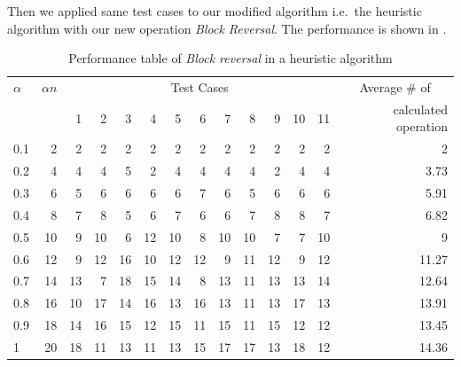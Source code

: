 				
Then we applied same test cases to our modified algorithm i.e.\ the
heuristic algorithm with our new operation \textit{Block Reversal}. The
performance is shown in .


\begin{table}[!tb]
  \begin{center}
    \caption{Performance table of \emph{Block reversal} in a heuristic algorithm}
    \label{tab_our}

    \begin{tabular}{|l|r|r|r|r|r|r|r|r|r|r|r|r|r|}
      \hline
      $\alpha$     & $\alpha n$ & \multicolumn{11}{c|}{Test Cases} & \multicolumn{1}{c|}{Average \# of}                                     \\
      \cline{3-13} &            & 1                                & 2  & 3  & 4  & 5  & 6  & 7  & 8  & 9  & 10 & 11 & calculated operation \\
      \hline
      0.1        & 2          & 2                                & 2	& 2  & 2  & 2  & 2  & 2  & 2  &	2  & 2	& 2  & 2                    \\
      0.2        & 4          & 4                                & 4	& 5  & 2  & 4  & 4  & 4  & 4  &	2  & 4	& 4  & 3.73                 \\
      0.3        & 6          & 5                                & 6	& 6  & 6  & 6  & 7  & 6  & 5  &	6  & 6	& 6  & 5.91                 \\
      0.4        & 8          & 7                                & 8	& 5  & 6  & 7  & 6  & 6  & 7  &	8  & 8	& 7  & 6.82                 \\
      0.5        & 10         & 9                                & 10	& 6  & 12 & 10 & 8  & 10 & 10 &	7  & 7	& 10 & 9                    \\
      0.6        & 12         & 9                                & 12	& 16 & 10 & 12 & 12 & 9  & 11 &	12 & 9	& 12 & 11.27                \\
      0.7        & 14         & 13                               & 7	& 18 & 15 & 14 & 8  & 13 & 11 &	13 & 13	& 14 & 12.64                \\
      0.8        & 16         & 10                               & 17	& 14 & 16 & 13 & 16 & 13 & 11 &	13 & 17	& 13 & 13.91                \\
      0.9        & 18         & 14                               & 16	& 15 & 12 & 15 & 11 & 15 & 11 &	15 & 12	& 12 & 13.45                \\
      1          & 20         & 18                               & 11	& 13 & 11 & 13 & 15 & 17 & 17 &	13 & 18	& 12 & 14.36                \\
      \hline
    \end{tabular}
  \end{center}
\end{table}

